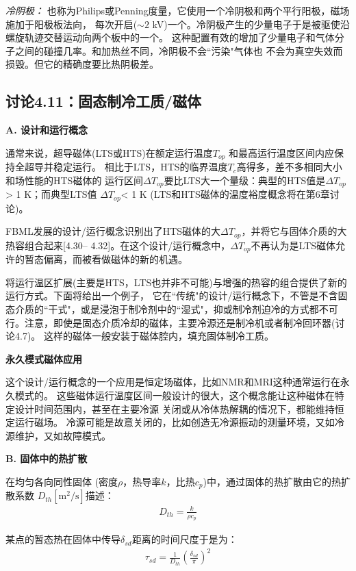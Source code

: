 \textit{冷阴极：} 也称为Philips或Penning度量，它使用一个冷阴极和两个平行阳极，磁场施加于阳极板法向，
每次开启($\sim 2$ kV)一个。冷阴极产生的少量电子于是被驱使沿螺旋轨迹交替运动向两个板中的一个。
这种配置有效的增加了少量电子和气体分子之间的碰撞几率。和加热丝不同，冷阴极不会``污染"气体也
不会为真空失效而损毁。但它的精确度要比热阴极差。

\subsection{讨论4.11：固态制冷工质/磁体}
\textbf{A. 设计和运行概念}

通常来说，超导磁体(LTS或HTS)在额定运行温度$T_{op}$ 和最高运行温度区间内应保持全超导并稳定运行。
相比于LTS，HTS的临界温度$T_c$高得多，差不多相同大小和场性能的HTS磁体的
运行区间$\Delta T_{op}$要比LTS大一个量级：典型的HTS值是$\Delta T_{op}$ > 1 K；而典型LTS值
$\Delta T_{op}$< 1 K (LTS和HTS磁体的温度裕度概念将在第6章讨论)。

FBML发展的设计/运行概念识别出了HTS磁体的大$\Delta T_{op}$，并将它与固体介质的大热容组合起来[4.30–
4.32]。在这个设计/运行概念中，$\Delta T_{op}$不再认为是LTS磁体允许的暂态偏离，而被看做磁体的新的机遇。

将运行温区扩展(主要是HTS，LTS也并非不可能)与增强的热容的组合提供了新的运行方式。下面将给出一个例子，
它在``传统"的设计/运行概念下，不管是不含固态介质的``干式"，或是浸泡于制冷剂中的``湿式"，抑或制冷剂迫冷的方式都不可行。注意，即使是固态介质冷却的磁体，主要冷源还是制冷机或者制冷回环器(讨论4.7)。
这样的磁体一般安装于磁体腔内，填充固体制冷工质。

\textbf{永久模式磁体应用}

这个设计/运行概念的一个应用是恒定场磁体，比如NMR和MRI这种通常运行在永久模式的。
这些磁体运行温度区间一般设计的很大，这个概念能让这种磁体在特定设计时间范围内，甚至在主要冷源
关闭或从冷体热解耦的情况下，都能维持恒定运行磁场。
冷源可能是故意关闭的，比如创造无冷源振动的测量环境，又如冷源维护，又如故障模式。

\textbf{B. 固体中的热扩散}

在均匀各向同性固体 (密度$\rho$，热导率$k$，比热$c_p$)中，通过固体的热扩散由它的热扩散系数 $D_{th}[\mathrm{m^2/s}]$描述：
\begin{align}%
D_{th}=\frac{k}{\rho c_p}
\end{align}

某点的暂态热在固体中传导$\delta_{sd}$距离的时间尺度于是为：
\begin{align}%
\tau_{sd}=\frac{1}{D_{th}}(\frac{\delta_{sd}}{\pi})^2
\end{align}

